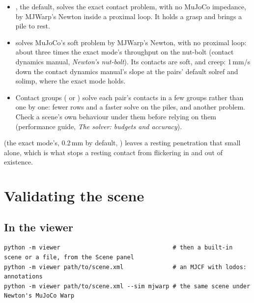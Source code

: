\begin{itemize}
\item {}, the default, solves the exact contact problem, with no MuJoCo impedance, by MJWarp's Newton inside a proximal loop. It holds a grasp and brings a pile to rest.
\item {} solves MuJoCo's soft problem by MJWarp's Newton, with no proximal loop: about three times the exact mode's throughput on the nut-bolt (contact dynamics manual, \emph{Newton's nut-bolt}). Its contacts are soft, and creep: 1\,mm/s down the contact dynamics manual's slope at the pairs' default solref and solimp, where the exact mode holds.
\item Contact groups ( or ) solve each pair's contacts in a few groups rather than one by one: fewer rows and a faster solve on the piles, and another problem. Check a scene's own behaviour under them before relying on them (performance guide, \emph{The solver: budgets and accuracy}).
\end{itemize}

 (the exact mode's, 0.2\,mm by default, ) leaves a resting penetration that small alone, which is what stops a resting contact from flickering in and out of existence.

\section{Validating the scene}\label{sec:validate}

\subsection{In the viewer}\label{sec:viewer}

\begin{lstlisting}
python -m viewer                                # then a built-in scene or a file, from the Scene panel
python -m viewer path/to/scene.xml              # an MJCF with lodos: annotations
python -m viewer path/to/scene.xml --sim mjwarp # the same scene under Newton's MuJoCo Warp
\end{lstlisting}

